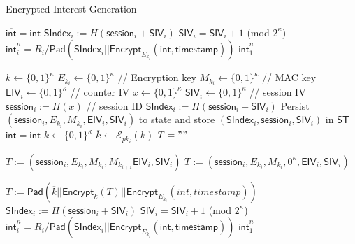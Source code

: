 \documentclass[10pt]{article}
\begin{document}
\begin{algorithm}[ht!]
  \caption{Encrypted Interest Generation}
  \begin{algorithmic}[1]

  \State $\overline{\mathsf{int}} = \mathsf{int}$
    \State $\mathsf{SIndex}_i := H(\mathsf{session}_i + \mathsf{SIV}_i)$
    \State $\mathsf{SIV}_i = \mathsf{SIV}_i + 1$ (mod $2^{\kappa}$)
    \State $\overline{\mathsf{int}}_i^n = R_i / \mathsf{Pad}(\mathsf{SIndex}_i || \mathsf{Encrypt}_{E_{k_i}}(\overline{\mathsf{int}}, \mathsf{timestamp}))$
  \EndFor
  \State \Return $\overline{\mathsf{int}}_1^n$
\Else

 
  \State $k \gets \{0,1\}^{\kappa}$
  \State $E_{k_i} \gets \{0,1\}^{\kappa}$ // Encryption key
  \State $M_{k_i} \gets \{0,1\}^{\kappa}$ // MAC key
  \State $\mathsf{EIV}_i \gets \{0,1\}^{\kappa}$     // counter IV
  \State $x \gets \{0,1\}^{\kappa}$
  \State $\mathsf{SIV}_i \gets \{0,1\}^{\kappa}$ // session IV
  \State $\mathsf{session}_i := H(x)$ // session ID
  \State $\mathsf{SIndex}_i := H(\mathsf{session}_i + \mathsf{SIV}_i)$
  \State Persist $(\mathsf{session}_i, E_{k_i}, M_{k_i}, \mathsf{EIV}_i, \mathsf{SIV}_i)$ to state and store $(\mathsf{SIndex}_i, \mathsf{session}_i, \mathsf{SIV}_i)$ in $\mathsf{ST}$
\EndFor
\State $\overline{\mathsf{int}} = \mathsf{int}$
 
  \State $k \gets \{0,1\}^{\kappa}$
  \State $\overline{k} \gets \mathcal{E}_{pk_i}(k)$
  \State $T = ""$

    \State $T := (\mathsf{session}_i, E_{k_i}, M_{k_i}, M_{k_{i+1}} \mathsf{EIV}_i, \mathsf{SIV}_i)$
  \Else
    \State $T := (\mathsf{session}_i, E_{k_i}, M_{k_i}, 0^{\kappa}, \mathsf{EIV}_i, \mathsf{SIV}_i)$
  \EndIf

  \State $T := \mathsf{Pad}(\overline{k} || \mathsf{Encrypt}_k(T) || \mathsf{Encrypt}_{E_{k_i}}(\overline{int}, timestamp))$
  \State $\mathsf{SIndex}_i := H(\mathsf{session}_i + \mathsf{SIV}_i)$
  \State $\mathsf{SIV}_i = \mathsf{SIV}_i + 1$ (mod $2^{\kappa}$)
  \State $\overline{\mathsf{int}}_i^n = R_i / \mathsf{Pad}(\mathsf{SIndex}_i || \mathsf{Encrypt}_{E_{k_i}}(\overline{\mathsf{int}}, \mathsf{timestamp}))$
\EndFor
\State \Return $\overline{\mathsf{int}}_1^n$  
  

\end{algorithmic}
\end{algorithm}
\end{document}
